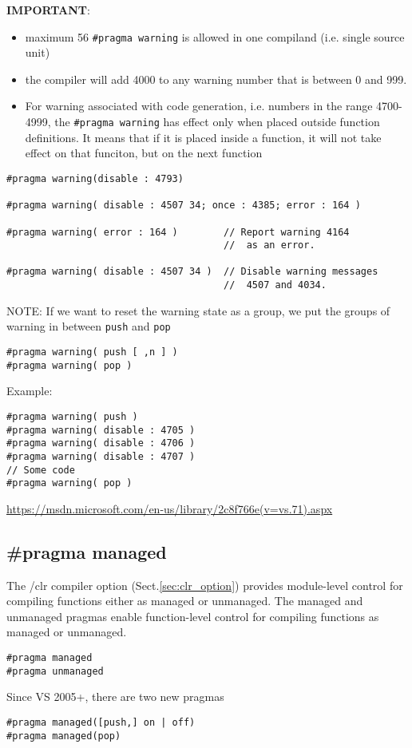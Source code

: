 {\bf IMPORTANT}:
\begin{itemize}
  \item maximum 56 \verb!#pragma warning! is allowed in one compiland (i.e. single source unit)
  
  \item the compiler will add 4000 to any warning number that is
between 0 and 999. 

  \item For warning associated with code generation, i.e. numbers in the range
  4700-4999, the \verb!#pragma warning! has effect only when placed outside function
  definitions. It means that if it is placed inside a function, it will not take effect on that funciton, but on the next function
\end{itemize}

\begin{verbatim}
#pragma warning(disable : 4793)

#pragma warning( disable : 4507 34; once : 4385; error : 164 )

#pragma warning( error : 164 )        // Report warning 4164
                                      //  as an error.
                                      
#pragma warning( disable : 4507 34 )  // Disable warning messages
                                      //  4507 and 4034.                                      
\end{verbatim}

NOTE: If we want to reset the warning state as a group, we put the groups of warning in between \verb!push! and \verb!pop!
\begin{verbatim}
#pragma warning( push [ ,n ] )
#pragma warning( pop )
\end{verbatim}

Example:
\begin{verbatim}
#pragma warning( push )
#pragma warning( disable : 4705 )
#pragma warning( disable : 4706 )
#pragma warning( disable : 4707 )
// Some code
#pragma warning( pop ) 
\end{verbatim}

\url{https://msdn.microsoft.com/en-us/library/2c8f766e(v=vs.71).aspx}


\subsection{\#pragma managed}
\label{sec:pragma_managed}

The /clr compiler option (Sect.\ref{sec:clr_option}) provides module-level
control for compiling functions either as managed or unmanaged. The managed and
unmanaged pragmas enable function-level control for compiling functions as
managed or unmanaged.
\begin{verbatim}
#pragma managed
#pragma unmanaged
\end{verbatim}
Since VS 2005+, there are two new pragmas
\begin{verbatim}
#pragma managed([push,] on | off)
#pragma managed(pop)
\end{verbatim}

